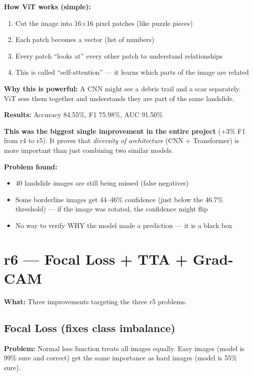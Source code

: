 \documentclass[11pt]{article}
\begin{document}
\textbf{How ViT works (simple):}
\begin{enumerate}[noitemsep]
    \item Cut the image into 16$\times$16 pixel patches (like puzzle pieces)
    \item Each patch becomes a vector (list of numbers)
    \item Every patch ``looks at'' every other patch to understand relationships
    \item This is called ``self-attention'' --- it learns which parts of the image are related
\end{enumerate}

\textbf{Why this is powerful:} A CNN might see a debris trail and a scar separately. ViT sees them together and understands they are part of the same landslide.

\textbf{Results:} Accuracy 84.55\%, F1 75.98\%, AUC 91.50\%

\textbf{This was the biggest single improvement in the entire project} (+3\% F1 from r4 to r5). It proves that \textit{diversity of architecture} (CNN + Transformer) is more important than just combining two similar models.

\textbf{Problem found:}
\begin{itemize}[noitemsep]
    \item 40 landslide images are still being missed (false negatives)
    \item Some borderline images get 44--46\% confidence (just below the 46.7\% threshold) --- if the image was rotated, the confidence might flip
    \item No way to verify WHY the model made a prediction --- it is a black box
\end{itemize}

\section{r6 --- Focal Loss + TTA + Grad-CAM}

\textbf{What:} Three improvements targeting the three r5 problems.

\subsection{Focal Loss (fixes class imbalance)}

\textbf{Problem:} Normal loss function treats all images equally. Easy images (model is 99\% sure and correct) get the same importance as hard images (model is 55\% sure).
\end{document}
